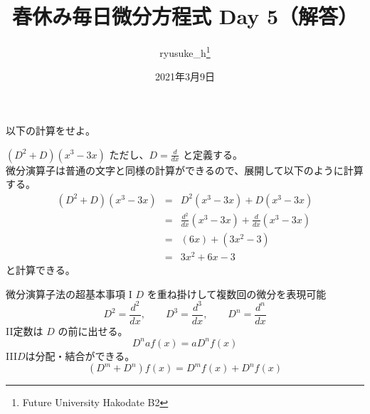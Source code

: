 \documentclass[a4j]{jsarticle}
\title{春休み毎日微分方程式 Day 5（解答）}
\author{ryusuke\_h\thanks{Future University Hakodate B2}}
\date{2021年3月9日}
\begin{document}
\begin{spacing}{1.6}
\maketitle

以下の計算をせよ。
\begin{qparts}
    \qpart $ \displaystyle (D ^ 2 + D)(x ^ 3 - 3x) $ \quad ただし、$ \displaystyle D = \frac{d}{dx} $ と定義する。\\
    微分演算子は普通の文字と同様の計算ができるので、展開して以下のように計算する。 \\
    \begin{eqnarray*}
      (D ^ 2 + D)(x ^ 3 - 3x) & = & D ^ 2 (x ^ 3 - 3x) + D (x ^ 3 - 3x)\\
      & = & \frac{d^2}{dx}(x ^ 3 - 3x) + \frac{d}{dx}(x ^ 3 - 3x)\\
      & = & (6x) + (3x ^ 2 - 3)\\
      & = & 3x ^ 2  + 6x - 3
    \end{eqnarray*}
    と計算できる。\\
    \begin{itembox}{微分演算子法の超基本事項}
      {\rm I} \quad $ D $ を重ね掛けして複数回の微分を表現可能 \\
      \begin{equation*}
        D^2 = \frac{d^2}{dx},\qquad D^3 = \frac{d ^ 3}{dx}, \qquad D ^ n = \frac{d^n}{dx}
      \end{equation*}
      {\rm II}\quad 定数は $ D $ の前に出せる。\\
      \begin{equation*}
        D^naf(x) = aD^nf(x)
      \end{equation*}
      {\rm III}\quad $ D $は分配・結合ができる。\\
      \begin{equation*}
        (D ^ m + D ^ n)f(x) = D^mf(x) + D^nf(x)
      \end{equation*}
    \end{itembox}
\end{qparts}
\end{spacing}
\end{document}
